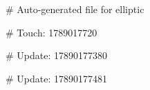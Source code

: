 # Auto-generated file for elliptic

# Touch: 1789017720

# Update: 17890177380

# Update: 17890177481
